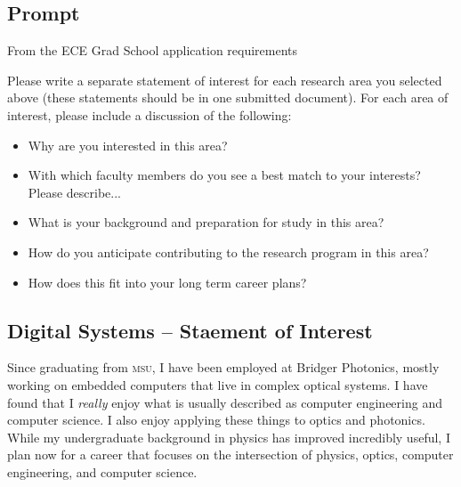 \documentclass{article}
\author{Nelson Goldsworth}
\date{\today}
\begin{document}
\subsection*{Prompt}

From the ECE Grad School application requirements

\begin{displayquote}
\ttfamily
 Please write a separate statement of interest for each research area you selected above
 (these statements should be in one submitted document). 
 For each area of interest, please include a discussion of the following:
\begin{itemize}
    \item Why are you interested in this area?
    \item With which faculty members do you see a best match to your interests? Please describe...
    \item What is your background and preparation for study in this area?
    \item How do you anticipate contributing to the research program in this area?
    \item How does this fit into your long term career plans?
    \end{itemize}
\end{displayquote}

\newpage
\subsection*{Digital Systems -- Staement of Interest}

Since graduating from \textsc{msu}, I have been employed at Bridger Photonics, mostly working on embedded computers that live in complex optical systems.
I have found that I \textit{really} enjoy what is usually described as computer engineering and computer science. I also enjoy applying these things to optics and photonics. 
While my undergraduate background in physics has improved incredibly useful, I plan now for a career that focuses on the intersection of physics, optics, computer engineering, and computer science.
\end{document}
